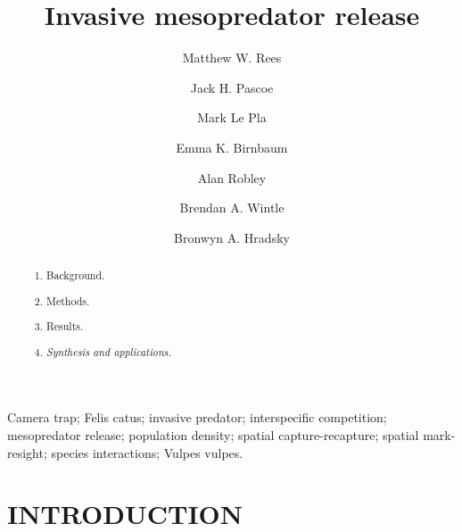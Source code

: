 \documentclass[]{elsarticle} %
\begin{document}
\begin{frontmatter}

  \title{Invasive mesopredator release}
    \author[UOM]{Matthew W. Rees}
    \author[CEC]{Jack H. Pascoe}
  
    \author[CEC]{Mark Le Pla}
  
    \author[CEC]{Emma K. Birnbaum}
  
    \author[ARI]{Alan Robley}
  
    \author[UOM]{Brendan A. Wintle}
  
    \author[UOM]{Bronwyn A. Hradsky}
  
      \address[UOM]{Quantitative \& Applied Ecology Group, School of Ecosystem and Forest Science, The University of Melbourne, Parkville, VIC, Australia}
    \address[CEC]{Conservation Ecology Centre, Otway Lighthouse Rd, Cape Otway, VIC, Australia}
    \address[ARI]{Department of Environment, Land, Water and Planning, Arthur Rylah Institute for Environmental Research, Heidelberg, Australia}
  
  \begin{abstract}
  \begin{enumerate}
  \def\labelenumi{\arabic{enumi}.}
  \item
    Background.
  \item
    Methods.
  \item
    Results.
  \item
    \emph{Synthesis and applications.}
  \end{enumerate}
  \end{abstract}
   \begin{keyword} Camera trap; Felis catus; invasive predator; interspecific competition; mesopredator release; population density; spatial capture-recapture; spatial mark-resight; species interactions; Vulpes vulpes.\end{keyword}
 \end{frontmatter}

\parskip=12pt

\newpage

\hypertarget{introduction}{%
\section{INTRODUCTION}\label{introduction}}
\end{document}
